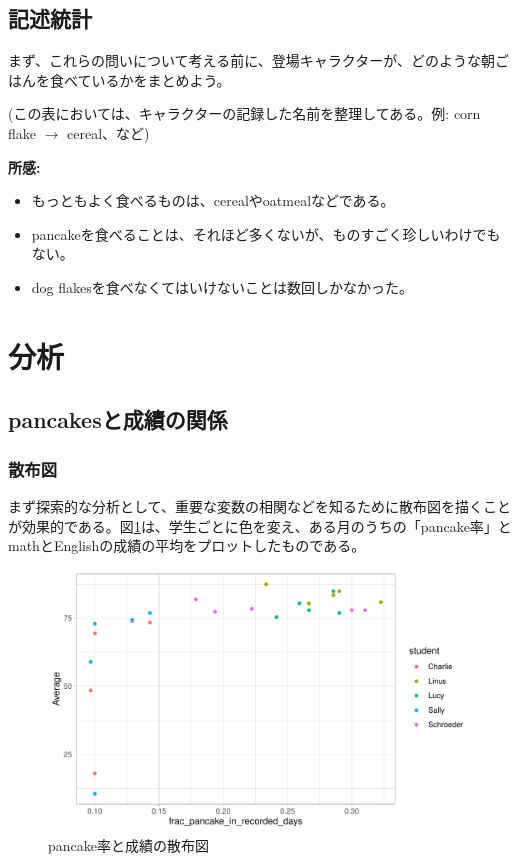 \documentclass[xelatex,ja=standard]{bxjsarticle}
\begin{document}
\subsection{記述統計}

まず、これらの問いについて考える前に、登場キャラクターが、どのような朝ごはんを食べているかをまとめよう。



(この表においては、キャラクターの記録した名前を整理してある。例: corn flake $\rightarrow$ cereal、など)

\textbf{所感:}
\begin{itemize}
\item もっともよく食べるものは、cerealやoatmealなどである。
\item pancakeを食べることは、それほど多くないが、ものすごく珍しいわけでもない。
\item dog flakesを食べなくてはいけないことは数回しかなかった。
\end{itemize}

\section{分析} 

\subsection{pancakesと成績の関係}
\subsubsection{散布図}
まず探索的な分析として、重要な変数の相関などを知るために散布図を描くことが効果的である。図\ref{fig:img1}は、学生ごとに色を変え、ある月のうちの「pancake率」とmathとEnglishの成績の平均をプロットしたものである。

\begin{figure}[h]
\centering
\includegraphics[width=12cm]{04_analyze/pancakes_study/figure/average_test_score.pdf}
\caption{pancake率と成績の散布図}
\label{fig:img1}
\end{figure}
\end{document}
